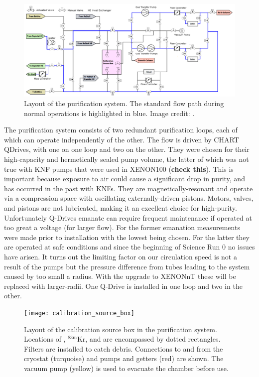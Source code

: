 \begin{figure}
\centering
\includegraphics[width=\textwidth]{PurificationLayout}
\caption{Layout of the purification system.  The standard flow path during normal operations is highlighted in blue.  Image credit:
.}
\label{fig:xenon1t_pur_schematic}
\end{figure}

The purification system consists of two redundant purification loops, each of which can operate independently of the other.  The flow
is driven by CHART QDrives, with one on one loop and two on the other.  They were chosen for their high-capacity and hermetically sealed
pump volume, the latter of which was not true with KNF pumps that were used in XENON100 (\textbf{check this}).  This is important because
exposure to air could cause a significant drop in purity, and has occurred in the past with KNFs.  They are
magnetically-resonant and operate via a compression space with oscillating externally-driven pistons.  Motors, valves, and pistons are
not lubricated, making it an excellent choice for high-purity.  Unfortunately Q-Drives emanate  can require frequent
maintenance if operated at too great a voltage (for larger flow).  For the former  emanation measurements were made prior to
installation with the lowest being chosen.  For the latter they are operated at safe conditions and since the beginning of Science Run 0
no issues have arisen.  It turns out the limiting factor on our circulation speed is not a result of the pumps but the pressure difference
from tubes leading to the system caused by too small a radius.  With the upgrade to XENONnT these will be replaced with larger-radii.  One
Q-Drive is installed in one loop and two in the other.

\begin{figure}
\centering
\texttt{[image: calibration\_source\_box]}
\caption{Layout of the calibration source box in the purification system.  Locations of , $^{83\mathrm{m}}\mathrm{Kr}$, and
 are encompassed by dotted rectangles.  Filters are installed to catch debris.  Connections to and from the cryostat (turquoise)
and pumps and getters (red) are shown.  The vacuum pump (yellow) is used to evacuate the chamber before use.}
\label{fig:xenon1t_pur_schematic}
\end{figure}

